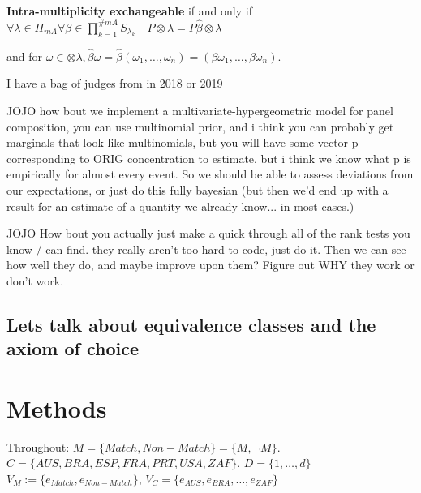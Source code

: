 \documentclass{article}
\theoremstyle{definition}
\begin{document}
\textbf{Intra-multiplicity exchangeable} if and only if 
$ \forall \lambda \in \Pi_{mA} \forall \beta \in \prod_{k=1}^{\#mA} S_{\lambda_k} \quad P\otimes\lambda=P\hat{\beta}\otimes\lambda$

and for $\omega\in\otimes\lambda, \hat{\beta}\omega=\hat{\beta}(\omega_1,\dots,\omega_n) = (\beta\omega_1,\dots,\beta\omega_n)$.

I have a bag of judges from in 2018 or 2019



JOJO how bout we implement a multivariate-hypergeometric model for panel composition, you can use multinomial prior, and i think you can probably get marginals that look like multinomials, but you will have some vector p corresponding to ORIG concentration to estimate, but i think we know what p is empirically for almost every event. So we should be able to assess deviations from our expectations, or just do this fully bayesian (but then we'd end up with a result for an estimate of a quantity we already know... in most cases.)

JOJO How bout you actually just make a quick through all of the rank tests you know / can find. they really aren't too hard to code, just do it. Then we can see how well they do, and maybe improve upon them? Figure out WHY they work or don't work.

\subsection{Lets talk about equivalence classes and the axiom of choice}


\section{Methods}
Throughout:
$M = \{Match,Non-Match\} = \{M,\neg M\}$. $C = \{AUS,BRA,ESP,FRA,PRT,USA,ZAF\}$. $D = \{1,\dots,d\}$
$V_M := \{e_{Match},e_{Non-Match}\} $, $V_C = \{ e_{AUS},e_{BRA},\dots,e_{ZAF} \}$
\end{document}
